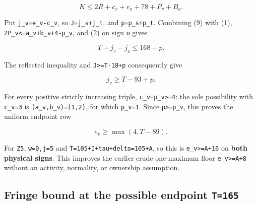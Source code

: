 \documentclass[10pt,a4paper]{article}
\theoremstyle{definition}
\begin{document}
\[
 K\le2R+\allowbreak{}c_v+\allowbreak{}e_o+\allowbreak{}78+\allowbreak{}P_v+\allowbreak{}B_o.                          \tag{9}
\]

Put \texttt{j\_\allowbreak{}\allowbreak{}v=\allowbreak{}e\_\allowbreak{}\allowbreak{}v-c\_\allowbreak{}\allowbreak{}v},\allowbreak{} so
\texttt{J=\allowbreak{}j\_\allowbreak{}\allowbreak{}s+\allowbreak{}j\_\allowbreak{}\allowbreak{}t},\allowbreak{} and
\texttt{p=\allowbreak{}p\_\allowbreak{}\allowbreak{}s+\allowbreak{}p\_\allowbreak{}\allowbreak{}t}. Combining (9) with (1),\allowbreak{}
\texttt{2P\_\allowbreak{}\allowbreak{}v<=\allowbreak{}a\_\allowbreak{}\allowbreak{}v+\allowbreak{}b\_\allowbreak{}\allowbreak{}v+\allowbreak{}4-p\_\allowbreak{}\allowbreak{}v},\allowbreak{} and (2) on sign
\texttt{o} gives

\[
 T+\allowbreak{}j_v-j_o\le168-p.
\]

The reflected inequality and \texttt{J>=\allowbreak{}T-18+\allowbreak{}p}
consequently give

\[
 j_v\ge T-93+\allowbreak{}p.
\]

For every positive strictly increasing triple,\allowbreak{}
\texttt{c\_\allowbreak{}\allowbreak{}v+\allowbreak{}p\_\allowbreak{}\allowbreak{}v>=\allowbreak{}4}: the sole possibility with
\texttt{c\_\allowbreak{}\allowbreak{}v=\allowbreak{}3} is
\texttt{(a\_\allowbreak{}\allowbreak{}v,\allowbreak{}b\_\allowbreak{}\allowbreak{}v)=\allowbreak{}(1,\allowbreak{}2)},\allowbreak{} for which
\texttt{p\_\allowbreak{}\allowbreak{}v=\allowbreak{}1}. Since
\texttt{p>=\allowbreak{}p\_\allowbreak{}\allowbreak{}v},\allowbreak{} this proves the uniform endpoint row

\[
                         e_v\ge\max(4,\allowbreak{}T-89).         \tag{10}
\]

For \texttt{Z5},\allowbreak{} \texttt{w=\allowbreak{}0,\allowbreak{}j=\allowbreak{}5} and
\texttt{T=\allowbreak{}105+\allowbreak{}I+\allowbreak{}tau+\allowbreak{}delta=\allowbreak{}105+\allowbreak{}A},\allowbreak{} so this is
\texttt{e\_\allowbreak{}\allowbreak{}v>=\allowbreak{}A+\allowbreak{}16} on \textbf{both physical signs}.
This improves the earlier crude one-maximum floor
\texttt{e\_\allowbreak{}\allowbreak{}v>=\allowbreak{}A+\allowbreak{}8} without an activity,\allowbreak{} normality,\allowbreak{} or
ownership assumption.

\hypertarget{fringe-bound-at-the-possible-endpoint-t165}{%
\subsection{\texorpdfstring{Fringe bound at the possible endpoint
\texttt{T=\allowbreak{}165}}{Fringe bound at the possible endpoint T=\allowbreak{}165}}\label{fringe-bound-at-the-possible-endpoint-t165}}
\end{document}
